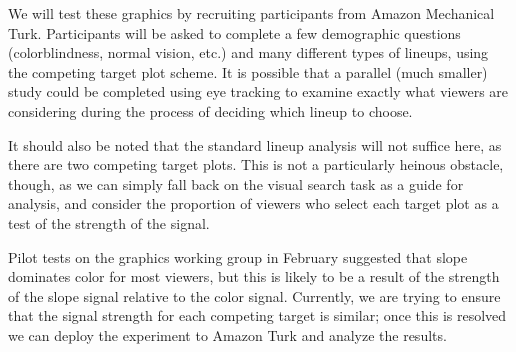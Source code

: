 \documentclass[11pt]{isuthesis}\usepackage[]{graphicx}\usepackage[]{color}
\begin{document}
We will test these graphics by recruiting participants from Amazon Mechanical Turk. Participants will be asked to complete a few demographic questions (colorblindness, normal vision, etc.) and many different types of lineups, using the competing target plot scheme. It is possible that a parallel (much smaller) study could be completed using eye tracking to examine exactly what viewers are considering during the process of deciding which lineup to choose. 

It should also be noted that the standard lineup analysis \citep{majumder2013validation} will not suffice here, as there are two competing target plots. This is not a particularly heinous obstacle, though, as we can simply fall back on the visual search task as a guide for analysis, and consider the proportion of viewers who select each target plot as a test of the strength of the signal. 

Pilot tests on the graphics working group in February suggested that slope dominates color for most viewers, but this is likely to be a result of the strength of the slope signal relative to the color signal. Currently, we are trying to ensure that the signal strength for each competing target is similar; once this is resolved we can deploy the experiment to Amazon Turk and analyze the results. 

% 
% 

\end{document}
